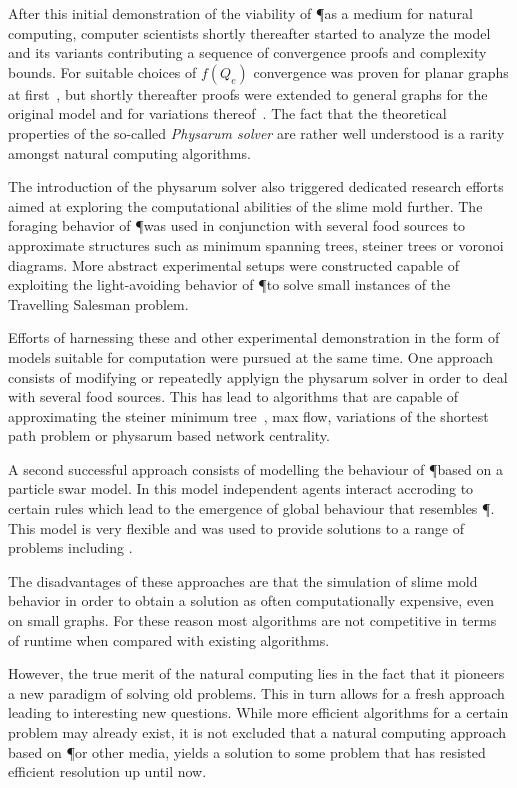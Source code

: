 	After this initial demonstration of the viability of \P as a medium for natural computing, computer scientists shortly thereafter started to analyze the model and its variants contributing a sequence of convergence proofs and complexity bounds. For suitable choices of $f(Q_e)$ convergence was proven for planar graphs at first~\cite{miyaji2007mathematical,miyaji2008physarum}, but shortly thereafter proofs were extended to general graphs for the original model and for variations thereof~\cite{Bonifaci2012121,bonifaci2013physarum,ito2011convergence,becchetti2013physarum}. The fact that the theoretical properties of the so-called \emph{Physarum solver} are rather well understood is a rarity amongst natural computing algorithms.

	

	The introduction of the physarum solver also triggered dedicated research efforts aimed at exploring the computational abilities of the slime mold further. The foraging behavior of \P was used in conjunction with several food sources to approximate structures such as minimum spanning trees, steiner trees or voronoi diagrams. More abstract experimental setups were constructed capable of exploiting the light-avoiding behavior of \P to solve small instances of the Travelling Salesman problem. 

	Efforts of harnessing these and other experimental demonstration in the form of models suitable for computation were pursued at the same time. One approach consists of modifying or repeatedly applyign the physarum solver in order to deal with several food sources. This has lead to algorithms that are capable of approximating the steiner minimum tree~\cite{6684158}, max flow, variations of the shortest path problem or physarum based network centrality.

	A second successful approach consists of modelling the behaviour of \P based on a particle swar model. In this model independent agents interact accroding to certain rules which lead to the emergence of global behaviour that resembles \P. This model is very flexible and was used to provide solutions to a range of problems including .

	The disadvantages of these approaches are that the simulation of slime mold behavior in order to obtain a solution as often computationally expensive, even on small graphs. For these reason most algorithms are not competitive in terms of runtime when compared with existing algorithms. 

	However, the true merit of the natural computing lies in the fact that it pioneers a new paradigm of solving old problems. This in turn allows for a fresh approach leading to interesting new questions. While more efficient algorithms for a certain problem may already exist, it is not excluded that a natural computing approach based on \P or other media, yields a solution to some problem that has resisted efficient resolution up until now.


